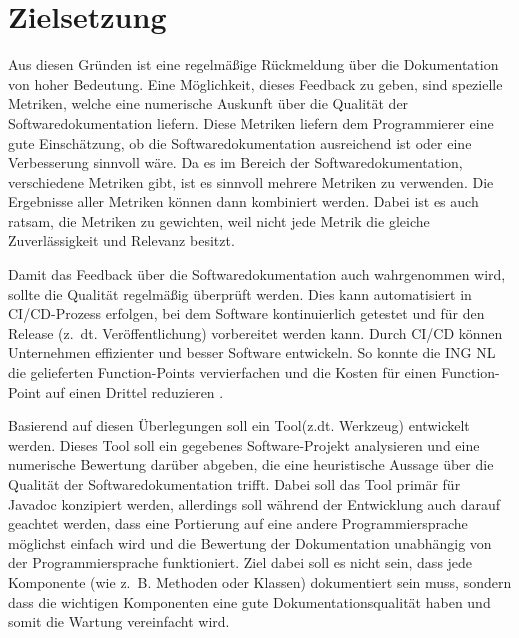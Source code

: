 \section{Zielsetzung}
Aus diesen Gründen ist eine regelmäßige Rückmeldung über die Dokumentation von hoher Bedeutung. Eine Möglichkeit, dieses Feedback zu geben, sind spezielle Metriken, welche eine numerische Auskunft über die Qualität der Softwaredokumentation liefern. Diese Metriken liefern dem Programmierer eine gute Einschätzung, ob die Softwaredokumentation ausreichend ist oder eine Verbesserung sinnvoll wäre. Da es im Bereich der Softwaredokumentation, verschiedene Metriken gibt, ist es sinnvoll mehrere Metriken zu verwenden. Die Ergebnisse aller Metriken können dann kombiniert werden. Dabei ist es auch ratsam, die Metriken zu gewichten, weil nicht jede Metrik die gleiche Zuverlässigkeit und Relevanz besitzt.

Damit das Feedback über die Softwaredokumentation auch wahrgenommen wird, sollte die Qualität regelmäßig  überprüft werden. Dies kann automatisiert in \ac{CI/CD}-Prozess erfolgen, bei dem Software kontinuierlich getestet und für den Release (z.~dt. Veröffentlichung) vorbereitet werden kann. Durch CI/CD können Unternehmen effizienter und besser Software entwickeln. So konnte die ING NL die gelieferten Function-Points vervierfachen und die Kosten für einen Function-Point auf einen Drittel reduzieren \cite[S. 520]{Vassallo2016}.

Basierend auf diesen Überlegungen soll ein Tool(z.dt. Werkzeug) entwickelt werden. Dieses Tool soll ein gegebenes Software-Projekt analysieren und eine numerische Bewertung darüber abgeben, die eine heuristische Aussage über die Qualität der Softwaredokumentation trifft.  Dabei soll das Tool primär für Javadoc konzipiert werden, allerdings soll während der Entwicklung auch darauf geachtet werden, dass eine Portierung auf eine andere Programmiersprache möglichst einfach wird und die Bewertung der Dokumentation unabhängig von der Programmiersprache funktioniert. Ziel dabei soll es nicht sein, dass jede Komponente (wie z.~B. Methoden oder Klassen) dokumentiert sein muss, sondern dass die wichtigen Komponenten eine gute Dokumentationsqualität haben und somit die Wartung vereinfacht wird. 



